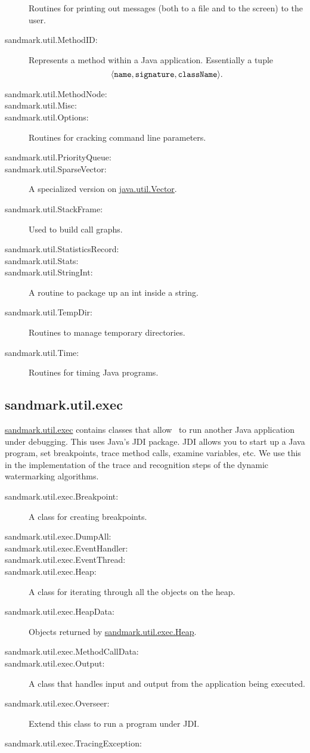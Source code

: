 \begin{description}
      Routines for printing out messages (both to a file
      and to the screen) to the user.
   \item[sandmark.util.MethodID:]  
      Represents a method within a Java application.
      Essentially a tuple 
      $$\langle {\tt name}, {\tt signature}, {\tt className}\rangle.$$
   \item[sandmark.util.MethodNode:]
   \item[sandmark.util.Misc:]
   \item[sandmark.util.Options:]
      Routines for cracking command line parameters.
   \item[sandmark.util.PriorityQueue:]
   \item[sandmark.util.SparseVector:]
      A specialized version on \url{java.util.Vector}.
   \item[sandmark.util.StackFrame:]
      Used to build call graphs.
   \item[sandmark.util.StatisticsRecord:]
   \item[sandmark.util.Stats:]
   \item[sandmark.util.StringInt:]
      A routine to package up an int inside a string.
   \item[sandmark.util.TempDir:]
      Routines to manage temporary directories.
   \item[sandmark.util.Time:]
      Routines for timing Java programs.
\end{description}

\subsection{sandmark.util.exec}
\url{sandmark.util.exec} contains classes that allow
\SM\ to run another Java application under 
debugging. This uses Java's JDI package. JDI
allows you to start up a Java program, set
breakpoints, trace method calls, examine 
variables, etc. We use this in the 
implementation of the trace and recognition 
steps of the dynamic watermarking algorithms.
\begin{description}
   \item[sandmark.util.exec.Breakpoint:]
       A class for creating breakpoints.
   \item[sandmark.util.exec.DumpAll:]
   \item[sandmark.util.exec.EventHandler:]
   \item[sandmark.util.exec.EventThread:]
   \item[sandmark.util.exec.Heap:]
       A class for iterating through all the objects on the heap.
   \item[sandmark.util.exec.HeapData:]
       Objects returned by \url{sandmark.util.exec.Heap}.
   \item[sandmark.util.exec.MethodCallData:]
   \item[sandmark.util.exec.Output:]
       A class that handles input and output from the
       application being executed.
   \item[sandmark.util.exec.Overseer:]
      Extend this class to run a program under JDI.
   \item[sandmark.util.exec.TracingException:]
\end{description}


